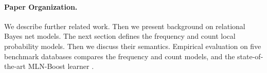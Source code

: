 \documentclass{article}
\begin{document}

\paragraph{Paper Organization.}
We describe further related work. 
Then we present background on relational Bayes net models.
The next section defines the frequency and count local probability models. Then we discuss their semantics.
Empirical evaluation on five benchmark databases compares the frequency and count models, and the state-of-the-art MLN-Boost learner \cite{Khot2011}.


%
%
%
%

%
\end{document}
